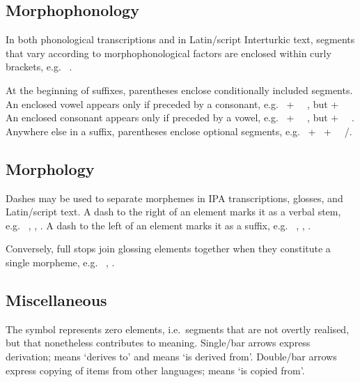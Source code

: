 \subsection*{Morphophonology}

In both phonological transcriptions and in Latin\-/script Interturkic text,
segments that vary according to morphophonological factors are enclosed within
curly brackets,
e.g.\  
\inlinegls{\Cond}.

At the beginning of suffixes, parentheses enclose conditionally included
segments.
An enclosed vowel appears only if preceded by a consonant,
e.g.\  +~
\derivesto~,
but  +~
\derivesto~
An enclosed consonant appears only if preceded by a vowel,
e.g.\  +~
\derivesto~,
but  +~
\derivesto~.
Anywhere else in a suffix, parentheses enclose optional segments,
e.g.\  +~
+~ \derivesto~/.

\subsection*{Morphology}

Dashes may be used to separate morphemes in IPA transcriptions, glosses, and
Latin\-/script text.
A dash to the right of an element marks it as a verbal stem,
e.g.\  , 
,  .
A dash to the left of an element marks it as a suffix,
e.g.\  \inlinegls{\Denom},  ,  \inlinegls{\Denom}.

Conversely, full stops join glossing elements together when they constitute a
single morpheme,
e.g.\  ,
 .

\subsection*{Miscellaneous}

The symbol \zero{} represents zero elements,
i.e.\ segments that are not overtly realised, but that nonetheless contributes
to meaning.
Single\-/bar arrows express derivation;
\derivesto{} means `derives to' and \derivesfrom{} means `is derived from'.
Double\-/bar arrows express copying of items from other languages;
\copiedfrom{} means `is copied from'.
